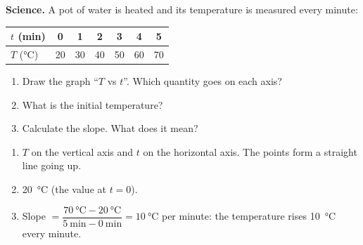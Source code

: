 \begin{exercise}
    \textbf{Science.} A pot of water is heated and its temperature is measured every minute:
    \begin{center}
        \begin{tabular}{lcccccc}
            \toprule
            \(t\) (min) & 0 & 1 & 2 & 3 & 4 & 5 \\
            \midrule
            \(T\) (\unit{\celsius}) & 20 & 30 & 40 & 50 & 60 & 70 \\
            \bottomrule
        \end{tabular}
    \end{center}
    \begin{enumerate}[label=\letraminuscula]
        \item Draw the graph ``\(T\) vs \(t\)''. Which quantity goes on each axis?
        \item What is the initial temperature?
        \item Calculate the slope. What does it mean?
    \end{enumerate}
    \begin{solu}
        \begin{enumerate}[label=\alph*)]
            \item \(T\) on the vertical axis and \(t\) on the horizontal axis. The points form a straight line going up.
            \item \qty{20}{\celsius} (the value at \(t = 0\)).
            \item Slope \(= \dfrac{\qty{70}{\celsius} - \qty{20}{\celsius}}{\qty{5}{\minute} - \qty{0}{\minute}} = \qty{10}{\celsius}\) per minute: the temperature rises \qty{10}{\celsius} every minute.
        \end{enumerate}
    \end{solu}
\end{exercise}

